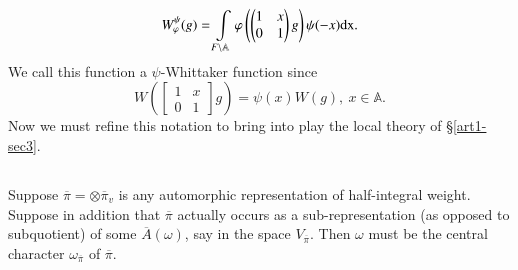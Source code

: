 \begin{equation}
W^{\psi}_{\varphi}(g)=\int\limits_{F\backslash \mathbb{A}}\varphi\left(\left(\begin{matrix} 1 & x\\ 0 & 1\end{matrix}\right)g\right)\psi(-x)\mathrm{dx}.
\end{equation}
We call this function a $\psi$-Whittaker function since
$$
W\left(\begin{bmatrix} 1 & x \\ 0 & 1\end{bmatrix} g\right)=\psi(x)W(g), \ x\in \mathbb{A}.
$$
Now we must refine this notation to bring into play the local theory of \S\ref{art1-sec3}.

\subsection{}\label{art1-sec10.2}
Suppose $\overline{\pi}=\otimes \overline{\pi}_{v}$ is any automorphic representation of half-integral weight. Suppose in addition that $\overline{\pi}$ actually occurs as a sub-representation (as opposed to subquotient) of some $\overline{A}(\omega)$, say in the space $V_{\overline{\pi}}$. Then $\omega$ must be the central character $\omega_{\overline{\pi}}$ of $\overline{\pi}$.

